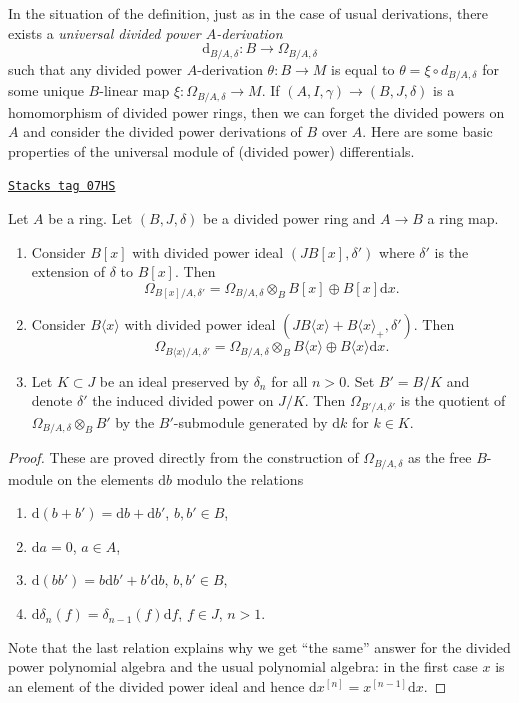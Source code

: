 In the situation of the definition, just as in the case of usual
derivations, there exists a {\it universal divided power $A$-derivation}
$$
\text{d}_{B/A, \delta} : B \to \Omega_{B/A, \delta}
$$
such that any divided power $A$-derivation $\theta : B \to M$ is equal to
$\theta = \xi \circ d_{B/A, \delta}$ for some unique $B$-linear map
$\xi : \Omega_{B/A, \delta} \to M$. If $(A, I, \gamma) \to (B, J, \delta)$
is a homomorphism of divided power rings, then we can forget the
divided powers on $A$ and consider the divided power derivations of
$B$ over $A$. Here are some basic properties of the universal
module of (divided power) differentials.

\begin{lemma}[Omega]
\label{crystalline-lemma-omega}
\href{https://stacks.math.columbia.edu/tag/07HS}{\texttt{Stacks tag 07HS}}

Let $A$ be a ring. Let $(B, J, \delta)$ be a divided power ring and
$A \to B$ a ring map.
\begin{enumerate}
\item Consider $B[x]$ with divided power ideal $(JB[x], \delta')$
where $\delta'$ is the extension of $\delta$ to $B[x]$. Then
$$
\Omega_{B[x]/A, \delta'} =
\Omega_{B/A, \delta} \otimes_B B[x] \oplus B[x]\text{d}x.
$$
\item Consider $B\langle x \rangle$ with divided power ideal
$(JB\langle x \rangle + B\langle x \rangle_{+}, \delta')$. Then
$$
\Omega_{B\langle x\rangle/A, \delta'} =
\Omega_{B/A, \delta} \otimes_B B\langle x \rangle \oplus
B\langle x\rangle \text{d}x.
$$
\item Let $K \subset J$ be an ideal preserved by $\delta_n$ for
all $n > 0$. Set $B' = B/K$ and denote $\delta'$ the induced
divided power on $J/K$. Then $\Omega_{B'/A, \delta'}$ is the quotient
of $\Omega_{B/A, \delta} \otimes_B B'$ by the $B'$-submodule generated
by $\text{d}k$ for $k \in K$.
\end{enumerate}
\end{lemma}

\begin{proof}
These are proved directly from the construction of $\Omega_{B/A, \delta}$
as the free $B$-module on the elements $\text{d}b$ modulo the relations
\begin{enumerate}
\item $\text{d}(b + b') = \text{d}b + \text{d}b'$, $b, b' \in B$,
\item $\text{d}a = 0$, $a \in A$,
\item $\text{d}(bb') = b \text{d}b' + b' \text{d}b$, $b, b' \in B$,
\item $\text{d}\delta_n(f) = \delta_{n - 1}(f)\text{d}f$, $f \in J$, $n > 1$.
\end{enumerate}
Note that the last relation explains why we get ``the same'' answer for
the divided power polynomial algebra and the usual polynomial algebra:
in the first case $x$ is an element of the divided power ideal and hence
$\text{d}x^{[n]} = x^{[n - 1]}\text{d}x$.
\end{proof}

